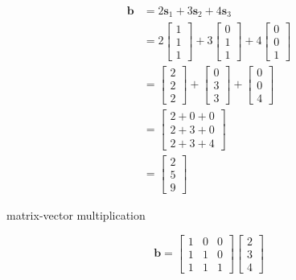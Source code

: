 \documentclass[main.tex]{subfiles}
\begin{document}
\begin{enumerate}
        $$
        \begin{aligned}
        \boldsymbol{b} &=2 \boldsymbol{s}_{1}+3 \boldsymbol{s}_{2}+4 \boldsymbol{s}_{3} \\
        &=2\left[\begin{array}{l}
        1 \\
        1 \\
        1
        \end{array}\right]+3\left[\begin{array}{l}
        0 \\
        1 \\
        1
        \end{array}\right]+4\left[\begin{array}{l}
        0 \\
        0 \\
        1
        \end{array}\right] \\
        &=\left[\begin{array}{l}
        2 \\
        2 \\
        2
        \end{array}\right]+\left[\begin{array}{l}
        0 \\
        3 \\
        3
        \end{array}\right]+\left[\begin{array}{l}
        0 \\
        0 \\
        4
        \end{array}\right] \\
        &=\left[\begin{array}{l}
        2+0+0 \\
        2+3+0 \\
        2+3+4
        \end{array}\right] \\
        &=\left[\begin{array}{l}
        2 \\
        5 \\
        9
        \end{array}\right]
        \end{aligned}
        $$
        
        matrix-vector multiplication
        
        $$
        \bm{b}=\left[\begin{array}{lll}
        1 & 0 & 0 \\
        1 & 1 & 0 \\
        1 & 1 & 1
        \end{array}\right]\left[\begin{array}{l}
        2 \\
        3 \\
        4
        \end{array}\right]
        $$
        

\end{enumerate}
\end{document}
